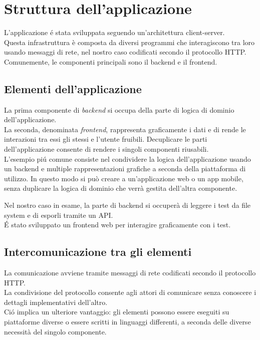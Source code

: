 \chapter{Struttura dell'applicazione}
    L'applicazione \'e stata sviluppata seguendo un'architettura client-server.\\
    
    Questa infrastruttura è composta da diversi programmi che interagiscono tra loro usando messaggi di rete, nel nostro caso codificati secondo il protocollo HTTP.
    Comunemente, le componenti principali sono il backend e il frontend.\\

    \section{Elementi dell'applicazione}
        La prima componente di \textit{backend} si occupa della parte di logica di dominio dell'applicazione.\\
        La seconda, denominata \textit{frontend}, rappresenta graficamente i dati e di rende le interazioni tra essi gli stessi e l'utente fruibili.
        Decuplicare le parti dell'applicazione consente di rendere i singoli componenti riusabili.\\

        L'esempio pi\'u comune consiste nel condividere la logica dell'applicazione usando un backend e multiple rappresentazioni grafiche a seconda della piattaforma di utilizzo.
        In questo modo si può creare a un'applicazione web o un app mobile, senza duplicare la logica di dominio che verrà gestita dell'altra componente.
        
        Nel nostro caso in esame, la parte di backend si occuperà di leggere i test da file system e di esporli tramite un API.\\
        \'E stato sviluppato un frontend web per interagire graficamente con i test.\\

    \section{Intercomunicazione tra gli elementi}
        La comunicazione avviene tramite messaggi di rete codificati secondo il protocollo HTTP.\\
        La condivisione del protocollo consente agli attori di comunicare senza conoscere i dettagli implementativi dell'altro.\\
        Ci\'o implica un ulteriore vantaggio: gli elementi possono essere eseguiti su piattaforme diverse o essere scritti in linguaggi differenti, a seconda delle diverse necessità del singolo componente.\\
        
